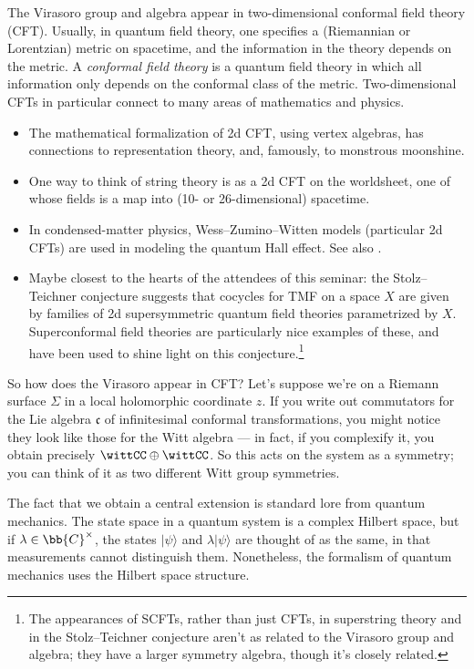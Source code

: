 \begin{remark}[(Applications)]  
\label{virasoro_applications}
The Virasoro group and algebra appear in two-dimensional conformal field theory (CFT). Usually, in quantum field
theory, one specifies a (Riemannian or Lorentzian) metric on spacetime, and the information in the theory depends
on the metric. A \emph{conformal field theory} is a quantum field theory in which all information only depends on
the conformal class of the metric. Two-dimensional CFTs in particular connect to many areas of mathematics and
physics.
\begin{itemize}
	\item The mathematical formalization of 2d CFT, using vertex algebras, has connections to representation
	theory, and, famously, to monstrous moonshine.

	\item One way to think of string theory is as a 2d CFT on the worldsheet, one of whose fields is a map into
	(10- or 26-dimensional) spacetime.

	\item In condensed-matter physics, Wess--Zumino--Witten models (particular 2d CFTs) are used in modeling the
	quantum Hall effect. See also .

	\item Maybe closest to the hearts of the attendees of this seminar: the Stolz--Teichner conjecture suggests that
	cocycles for TMF on a space $X$ are given by families of 2d supersymmetric quantum field theories parametrized
	by $X$. Superconformal field theories are particularly nice examples of these, and have been used to shine
	light on this conjecture.\footnote{The appearances of SCFTs, rather than just CFTs, in superstring theory and
	in the Stolz--Teichner conjecture aren't as related to the Virasoro group and algebra; they have a larger
	symmetry algebra, though it's closely related.}
\end{itemize}
So how does the Virasoro appear in CFT? Let's suppose we're on a Riemann surface $\Sigma$ in a local holomorphic
coordinate $z$. If you write out commutators for the Lie algebra $\mathfrak c$ of infinitesimal conformal
transformations, you might notice they look like those for the Witt algebra --- in fact, if you complexify it, you
obtain precisely $\wittCC \oplus \wittCC $. So this acts on the system as a symmetry; you can think of it as two
different Witt group symmetries.

The fact that we obtain a central extension is standard lore from quantum mechanics. The state space in a quantum
system is a complex Hilbert space, but if $\lambda\in\bb{C}^\times$, the states $\vert\psi\rangle$ and $\lambda\vert\psi\rangle$ are
thought of as the same, in that measurements cannot distinguish them. Nonetheless, the formalism of quantum
mechanics uses the Hilbert space structure.


\end{remark}
